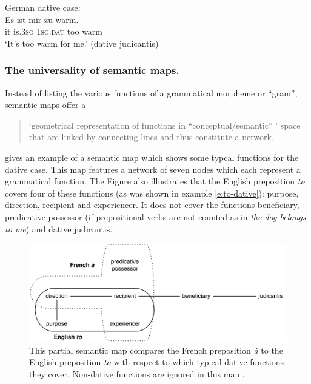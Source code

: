 \item German dative case:
\\
\gll Es ist mir zu warm.\\
it is.\textsc{3sg} 1\textsc{sg}.\textsc{dat} too warm\\
\glt `It's too warm for me.' (dative judicantis)\\
\z

\subsubsection{The universality of semantic maps.}

Instead of listing the various functions of a grammatical morpheme or ``gram'', semantic maps offer a
\begin{quote}
 `geometrical representation of functions in ``conceptual/semantic'' ' space that are linked by connecting lines and thus constitute a network. \citep[213]{haspelmath03geometry}
\end{quote}

  gives an example of a semantic map which shows some typcal functions for the dative case. This map features a network of seven nodes which each represent a grammatical function. The Figure also illustrates that the English preposition {\em to} covers four of these functions (as was shown in example \ref{e:to-dative}): purpose, direction, recipient and experiencer. It does not cover the functions beneficiary, predicative possessor (if prepositional verbs are not counted as in {\em the dog belongs to me}) and dative judicantis.
\begin{figure}[t]
\centerline{\includegraphics[width=\textwidth]{Chapter5/figs/semmap-to}}
  \caption[A semantic map of dative functions for {\em to} \citep{haspelmath03geometry}]{This partial semantic map compares the French preposition {\em à} to the English preposition {\em to} with respect to which typical dative functions they cover. Non-dative functions are ignored in this map \citep[adapted from][figures 8.1 and 8.2, p. 213 and 215]{haspelmath03geometry}.}
   \label{f:semmap-to}
\end{figure}

